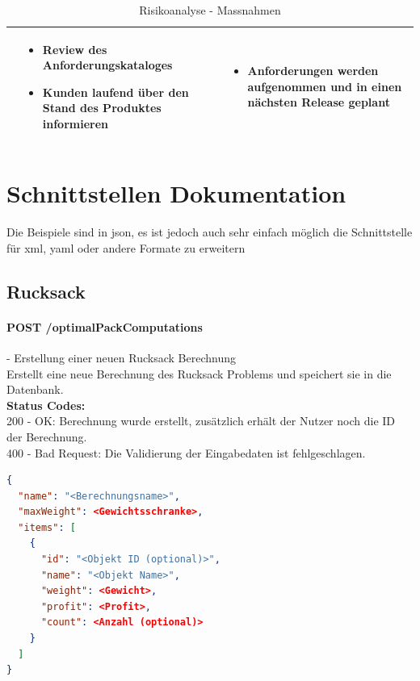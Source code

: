 \begin{table}[ht]
\begin{tabular}{  l | p{4.5cm} | p{4.5cm} }
								&	\begin{itemize}
										\item Review des Anforderungskataloges
										\item Kunden laufend über den Stand des Produktes informieren
									\end{itemize}
								&	\begin{itemize}
										\item Anforderungen werden aufgenommen und in einen nächsten Release geplant							
									\end{itemize}	\\ \hline			
  \end{tabular}
   \caption{Risikoanalyse - Massnahmen}
\end{table}

\clearpage
\newpage

\section{Schnittstellen Dokumentation}\label{api_doc}

Die Beispiele sind in \gls{json}, es ist jedoch auch sehr einfach möglich die Schnittstelle für \gls{xml}, \gls{yaml} oder andere Formate zu erweitern

%
%
%
%

\subsection{Rucksack}

\paragraph{POST /optimalPackComputations} - Erstellung einer neuen Rucksack Berechnung\mbox{}\\
Erstellt eine neue Berechnung des Rucksack Problems und speichert sie in die Datenbank.\\
\textbf{Status Codes:}\\
200 - OK: Berechnung wurde erstellt, zusätzlich erhält der Nutzer noch die ID der Berechnung.\\
400 - Bad Request: Die Validierung der Eingabedaten ist fehlgeschlagen.\\

\begin{lstlisting}[language=JSON, caption=Beispiel einer Eingabe für das Rucksack Problem, label=lst:input_knapsack]  
{
  "name": "<Berechnungsname>",
  "maxWeight": <Gewichtsschranke>,
  "items": [
    {
      "id": "<Objekt ID (optional)>",
      "name": "<Objekt Name>",
      "weight": <Gewicht>,
      "profit": <Profit>,
      "count": <Anzahl (optional)>
    }
  ]
}
\end{lstlisting}


